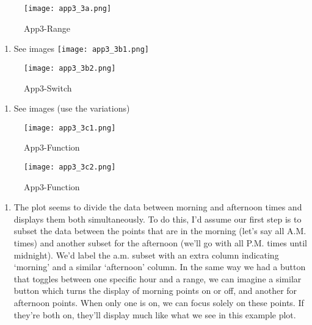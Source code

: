 \documentclass[
  letterpaper,
  DIV=11,
  numbers=noendperiod]{scrartcl}
\providecommand{\tightlist}{%
  \setlength{\itemsep}{0pt}\setlength{\parskip}{0pt}}\usepackage{longtable,booktabs,array}
\begin{document}
\begin{figure}[H]

{\centering \texttt{[image: app3\_3a.png]}

}

\caption{App3-Range}

\end{figure}%

\begin{enumerate}
\def\labelenumi{\alph{enumi}.}
\setcounter{enumi}{1}
\tightlist
\item
  See images \texttt{[image: app3\_3b1.png]}
\end{enumerate}

\begin{figure}[H]

{\centering \texttt{[image: app3\_3b2.png]}

}

\caption{App3-Switch}

\end{figure}%

\begin{enumerate}
\def\labelenumi{\alph{enumi}.}
\setcounter{enumi}{2}
\tightlist
\item
  See images (use the variations)
\end{enumerate}

\begin{figure}[H]

{\centering \texttt{[image: app3\_3c1.png]}

}

\caption{App3-Function}

\end{figure}%
\begin{figure}[H]

{\centering \texttt{[image: app3\_3c2.png]}

}

\caption{App3-Function}

\end{figure}%

\begin{enumerate}
\def\labelenumi{\alph{enumi}.}
\setcounter{enumi}{3}
\tightlist
\item
  The plot seems to divide the data between morning and afternoon times
  and displays them both simultaneously. To do this, I'd assume our
  first step is to subset the data between the points that are in the
  morning (let's say all A.M. times) and another subset for the
  afternoon (we'll go with all P.M. times until midnight). We'd label
  the a.m. subset with an extra column indicating `morning' and a
  similar `afternoon' column. In the same way we had a button that
  toggles between one specific hour and a range, we can imagine a
  similar button which turns the display of morning points on or off,
  and another for afternoon points. When only one is on, we can focus
  solely on these points. If they're both on, they'll display much like
  what we see in this example plot.
\end{enumerate}
\end{document}
